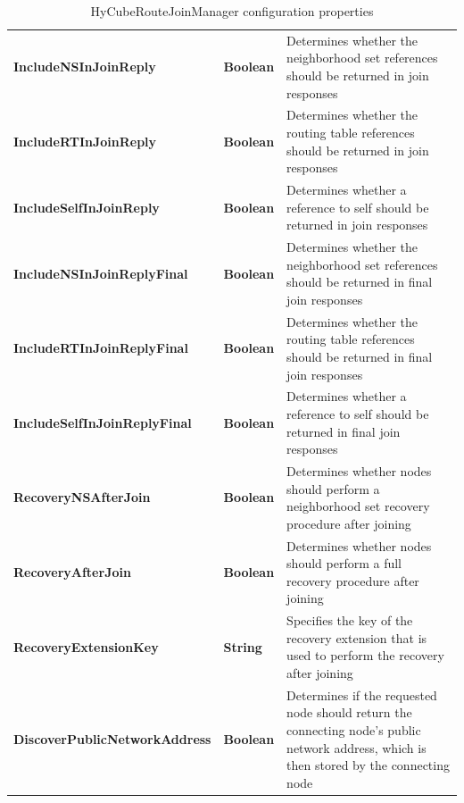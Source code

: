 \begin{table}
\begin{center}
\begin{tabular}{p{5cm} p{1.5cm} p{8.0cm}}
	\textbf{IncludeNSInJoinReply}				& \textbf{Boolean}				& Determines whether the neighborhood set references should be returned in join responses			\\[1.5mm]	
	\textbf{IncludeRTInJoinReply}				& \textbf{Boolean}				& Determines whether the routing table references should be returned in join responses 				\\[1.5mm]	
	\textbf{IncludeSelfInJoinReply}				& \textbf{Boolean}				& Determines whether a reference to self should be returned in join responses 						\\[1.5mm]	
	\textbf{IncludeNSInJoinReplyFinal}			& \textbf{Boolean}				& Determines whether the neighborhood set references should be returned in final join responses 			\\[1.5mm]	
	\textbf{IncludeRTInJoinReplyFinal}			& \textbf{Boolean}				& Determines whether the routing table references should be returned in final join responses 				\\[1.5mm]	
	\textbf{IncludeSelfInJoinReplyFinal}		& \textbf{Boolean}				& Determines whether a reference to self should be returned in final join responses 						\\[1.5mm]	
	
	\textbf{RecoveryNSAfterJoin}						& \textbf{Boolean}				& Determines whether nodes should perform a neighborhood set recovery procedure after joining 			\\[1.5mm]	
	\textbf{RecoveryAfterJoin}							& \textbf{Boolean}				& Determines whether nodes should perform a full recovery procedure after joining 			\\[1.5mm]	
	\textbf{RecoveryExtensionKey}						& \textbf{String}				& Specifies the key of the recovery extension that is used to perform the recovery after joining 			\\[1.5mm]	
	\textbf{DiscoverPublicNetworkAddress}				& \textbf{Boolean}				& Determines if the requested node should return the connecting node's public network address, which is then stored by the connecting node		\\[1.5mm]
    \hline
\end{tabular}
\end{center}
\caption{HyCubeRouteJoinManager configuration properties}
\label{tab:libHyCubeRouteJoinManager}
\end{table}



